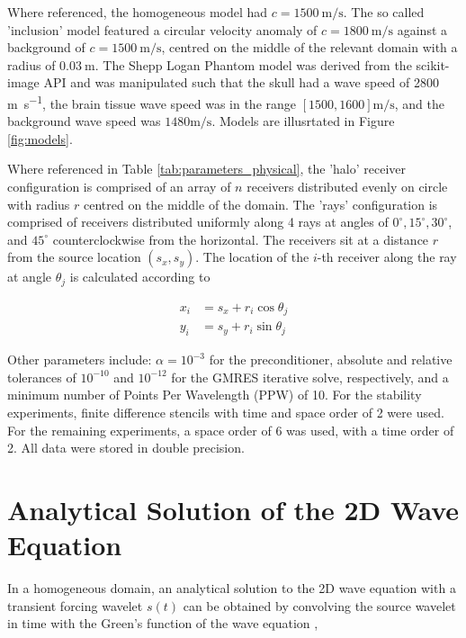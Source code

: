 \documentclass[final-report]{report-template}
\begin{document}
Where referenced, the homogeneous model had $c=\SI{1500}{\metre\per\second}$. The so called 'inclusion' model featured a circular velocity anomaly of $c=\SI{1800}{\metre\per\second}$ against a background of $c=\SI{1500}{\metre\per\second}$, centred on the middle of the relevant domain with a radius of $\SI{0.03}{\metre}$. The Shepp Logan Phantom model was derived from the scikit-image \cite{waltScikitimageImageProcessing2014} API and was manipulated such that the skull had a wave speed of 2800 \si{\metre\per\second}, the brain tissue wave speed was in the range $[1500, 1600] \si{\metre\per\second}$, and the background wave speed was $1480 \si{\metre\per\second}$. Models are illusrtated in Figure \ref{fig:models}.

Where referenced in Table \ref{tab:parameters_physical}, the 'halo' receiver configuration is comprised of an array of $n$ receivers distributed evenly on circle with radius $r$ centred on the middle of the domain. The 'rays' configuration is comprised of receivers distributed uniformly along 4 rays at angles of $0^{\circ}, 15^{\circ}, 30^{\circ}$, and $45^{\circ}$ counterclockwise from the horizontal. The receivers sit at a distance $r$ from the source location $(s_x, s_y)$. The location of the $i$-th receiver along the ray at angle $\theta_j$ is calculated according to

\begin{align*}
    x_i &= s_x + r_i\cos{\theta_j}\\
    y_i &= s_y + r_i \sin{\theta_j}
\end{align*}

Other parameters include: $\alpha = 10^{-3}$ for the preconditioner, absolute and relative tolerances of $10^{-10}$ and $10^{-12}$ for the GMRES iterative solve, respectively, and a minimum number of Points Per Wavelength (PPW) of 10. For the stability experiments,  finite difference stencils with time and space order of 2 were used. For the remaining experiments, a space order of 6 was used, with a time order of 2. All data were stored in double precision.

\section{Analytical Solution of the 2D Wave Equation}
\label{app:conv_reduct}

In a homogeneous domain, an analytical solution to the 2D wave equation with a transient forcing wavelet $s(t)$ can be obtained by convolving the source wavelet in time with the Green's function of the wave equation \cite{wapenaarMultipleReflectionsHuygens2025},
\end{document}
